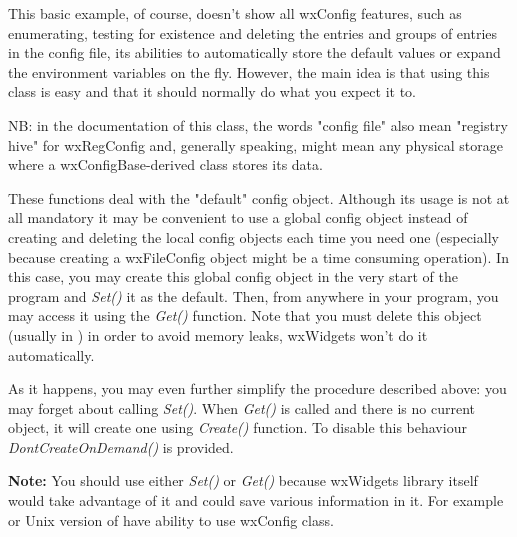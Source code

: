 This basic example, of course, doesn't show all wxConfig features, such as
enumerating, testing for existence and deleting the entries and groups of
entries in the config file, its abilities to automatically store the default
values or expand the environment variables on the fly. However, the main idea
is that using this class is easy and that it should normally do what you
expect it to.

NB: in the documentation of this class, the words "config file" also mean
"registry hive" for wxRegConfig and, generally speaking, might mean any
physical storage where a wxConfigBase-derived class stores its data.



\label{wxconfigstaticfunctions}

These functions deal with the "default" config object. Although its usage is
not at all mandatory it may be convenient to use a global config object
instead of creating and deleting the local config objects each time you need
one (especially because creating a wxFileConfig object might be a time
consuming operation). In this case, you may create this global config object
in the very start of the program and {\it Set()} it as the default. Then, from
anywhere in your program, you may access it using the {\it Get()} function.
Note that you must delete this object (usually in ) 
in order to avoid memory leaks, wxWidgets won't do it automatically.

As it happens, you may even further simplify the procedure described above:
you may forget about calling {\it Set()}. When {\it Get()} is called and there
is no current object, it will create one using {\it Create()} function. To
disable this behaviour {\it DontCreateOnDemand()} is provided.

{\bf Note:} You should use either {\it Set()} or {\it Get()} because wxWidgets
library itself would take advantage of it and could save various information
in it. For example  or Unix version
of  have ability to use wxConfig class.

\\
\\
\\


